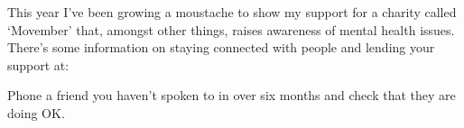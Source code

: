 
This year I've been growing a moustache to show my support
for a charity called `Movember' that, amongst other things,
raises awareness of mental health issues. There's some information
on staying connected with people and lending your support at:

\begin{exercise}
Phone a friend you haven't spoken to in over six months and check that they are doing OK.
\end{exercise}

